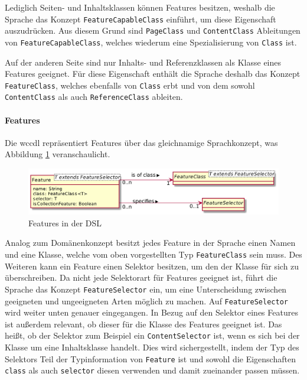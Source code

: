     Lediglich Seiten- und Inhaltsklassen können Features besitzen,
    weshalb die Sprache das Konzept \texttt{FeatureCapableClass} einführt,
    um diese Eigenschaft auszudrücken.
    Aus diesem Grund sind \texttt{PageClass} und \texttt{ContentClass}
    Ableitungen von \texttt{FeatureCapableClass}, welches
    wiederum eine Spezialisierung von \texttt{Class} ist.

    Auf der anderen Seite sind nur Inhalts- und Referenzklassen als Klasse eines Features geeignet.
    Für diese Eigenschaft enthält die Sprache deshalb das Konzept \texttt{FeatureClass},
    welches ebenfalls von \texttt{Class} erbt und
    von dem sowohl \texttt{ContentClass} als auch \texttt{ReferenceClass} ableiten.

    \paragraph{Features}
    Die \gls{wccdl} repräsentiert Features über das gleichnamige Sprachkonzept,
    was Abbildung \ref{image:dslFeatures} veranschaulicht.

    \begin{figure}[htb]
        \centering
        \includegraphics[scale=\imageScalingFactor]{../resources/dsl/features.png}
        \caption{Features in der DSL}
        \label{image:dslFeatures}
    \end{figure}

    Analog zum Domänenkonzept besitzt jedes Feature in der Sprache einen Namen
    und eine Klasse, welche vom oben vorgestellten Typ \texttt{FeatureClass} sein muss.
    Des Weiteren kann ein Feature einen Selektor besitzen,
    um den der Klasse für sich zu überschreiben.
    Da nicht jede Selektorart für Features geeignet ist,
    führt die Sprache das Konzept \texttt{FeatureSelector} ein,
    um eine Unterscheidung zwischen geeigneten und ungeeigneten Arten möglich zu machen.
    Auf \texttt{FeatureSelector} wird weiter unten genauer eingegangen.
    In Bezug auf den Selektor eines Features ist außerdem relevant,
    ob dieser für die Klasse des Features geeignet ist.
    Das heißt, ob der Selektor zum Beispiel ein \texttt{ContentSelector} ist,
    wenn es sich bei der Klasse um eine Inhaltsklasse handelt.
    Dies wird sichergestellt,
    indem der Typ des Selektors Teil der Typinformation von
    \texttt{Feature} ist und sowohl die Eigenschaften \texttt{class} als auch
    \texttt{selector} diesen verwenden und damit zueinander passen müssen.

